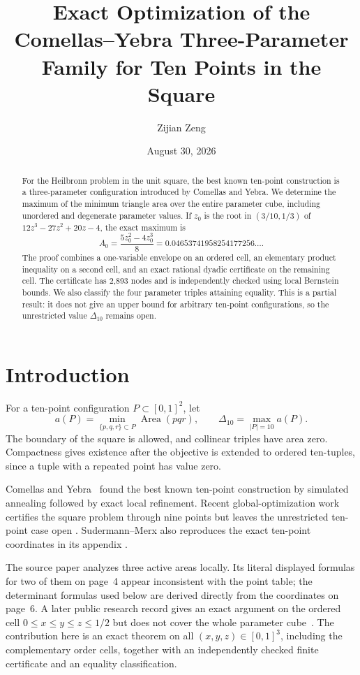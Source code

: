 \documentclass[11pt]{amsart}
\title[Exact optimization of a ten-point Heilbronn family]
{Exact Optimization of the Comellas--Yebra Three-Parameter Family for Ten Points in the Square}
\author{Zijian Zeng}
\date{August 30, 2026}
\theoremstyle{definition}
\newcommand{\Area}{\operatorname{Area}}
\begin{document}
\begin{abstract}
For the Heilbronn problem in the unit square, the best known ten-point
construction is a three-parameter configuration introduced by Comellas and
Yebra.  We determine the maximum of the minimum triangle area over the entire
parameter cube, including unordered and degenerate parameter values.  If
$z_0$ is the root in $(3/10,1/3)$ of
$12z^3-27z^2+20z-4$, the exact maximum is
\[
 A_0=\frac{5z_0^2-4z_0^3}{8}
 =0.04653741958254177256\ldots.
\]
The proof combines a one-variable envelope on an ordered cell, an elementary
product inequality on a second cell, and an exact rational dyadic certificate
on the remaining cell.  The certificate has 2,893 nodes and is independently
checked using local Bernstein bounds.  We also classify the four parameter
triples attaining equality.  This is a partial result: it does not give an
upper bound for arbitrary ten-point configurations, so the unrestricted value
$\Delta_{10}$ remains open.
\end{abstract}

\maketitle

\section{Introduction}

For a ten-point configuration $P\subset[0,1]^2$, let
\[
 a(P)=\min_{\{p,q,r\}\subset P}\Area(pqr),\qquad
 \Delta_{10}=\max_{|P|=10}a(P).
\]
The boundary of the square is allowed, and collinear triples have area zero.
Compactness gives existence after the objective is extended to ordered
ten-tuples, since a tuple with a repeated point has value zero.

Comellas and Yebra~\cite{ComellasYebra2002} found the best known ten-point
construction by simulated annealing followed by exact local refinement.
Recent global-optimization work certifies the square problem through nine
points but leaves the unrestricted ten-point case open
\cite{MonjiModirKocuk2025,SudermannMerx2026}.  Sudermann--Merx also reproduces
the exact ten-point coordinates in its appendix
\cite[Appendix~A]{SudermannMerx2026}.

The source paper analyzes three active areas locally.  Its literal displayed
formulas for two of them on page~4 appear inconsistent with the point table;
the determinant formulas used below are derived directly from the coordinates
on page~6.  A later public research record gives an exact argument on the
ordered cell $0\le x\le y\le z\le1/2$ but does not cover the whole parameter
cube~\cite{TheoremDB2026}.  The contribution here is an exact theorem on all
$(x,y,z)\in[0,1]^3$, including the complementary order cells, together with an
independently checked finite certificate and an equality classification.
\end{document}
